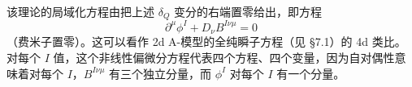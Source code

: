 该理论的局域化方程由把上述 $\delta_Q$ 变分的右端置零给出，即方程
\[
  \partial^\mu\phi^I+D_\nu B^{I\nu\mu}=0
\]
（费米子置零）。这可以看作 2d A-模型的全纯瞬子方程（见 §7.1）的 4d 类比。对每个 $I$ 值，这个非线性偏微分方程代表四个方程、四个变量，因为自对偶性意味着对每个 $I$，$B^{I\nu\mu}$ 有三个独立分量，而 $\phi^I$ 对每个 $I$ 有一个分量。



